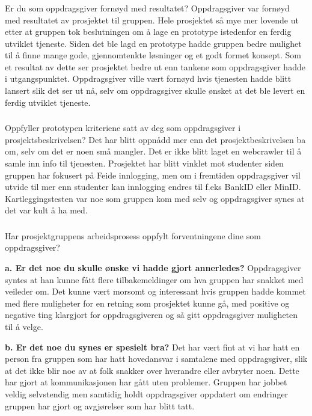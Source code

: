 \subsubsection{}{Er du som oppdragsgiver fornøyd med resultatet?}
Oppdragsgiver var fornøyd med resultatet av prosjektet til gruppen. Hele prosjektet så mye mer lovende ut etter at gruppen tok beslutningen om å lage en prototype istedenfor en ferdig utviklet tjeneste. Siden det ble lagd en prototype hadde gruppen bedre mulighet til å finne mange gode, gjennomtenkte løsninger og et godt formet konsept. Som et resultat av dette ser prosjektet bedre ut enn tankene som oppdragsgiver hadde i utgangspunktet. Oppdragsgiver ville vært fornøyd hvis tjenesten hadde blitt lansert slik det ser ut nå, selv om oppdragsgiver skulle ønsket at det ble levert en ferdig utviklet tjeneste.

\subsubsection{}{Oppfyller prototypen kriteriene satt av deg som oppdragsgiver i prosjektsbeskrivelsen?}
Det har blitt oppnådd mer enn det prosjektbeskrivelsen ba om, selv om det er noen små mangler. Det er ikke blitt laget en webcrawler til å samle inn info til tjenesten. Prosjektet har blitt vinklet mot studenter siden gruppen har fokusert på Feide innlogging, men om i fremtiden oppdragsgiver vil utvide til mer enn studenter kan innlogging endres til f.eks BankID eller MinID. Kartleggingstesten var noe som gruppen kom med selv og oppdragsgiver synes at det var kult å ha med. 

\subsubsection{}{Har prosjektgruppens arbeidsprosess oppfylt forventningene dine som oppdragsgiver?}

{\bf a. Er det noe du skulle ønske vi hadde gjort annerledes?}
Oppdragsgiver syntes at han kunne fått flere tilbakemeldinger om hva gruppen har snakket med veileder om. Det kunne vært morsomt og interessant hvis gruppen hadde kommet med flere muligheter for en retning som prosjektet kunne gå, med positive og negative ting klargjort for oppdragsgiveren og så gitt oppdragsgiver muligheten til å velge.

{\bf b. Er det noe du synes er spesielt bra?}
Det har vært fint at vi har hatt en person fra gruppen som har hatt hovedansvar i samtalene med oppdragsgiver, slik at det ikke blir noe av at folk snakker over hverandre eller avbryter noen. Dette har gjort at kommunikasjonen  har gått uten problemer. Gruppen har jobbet veldig selvstendig men samtidig holdt oppdragsgiver oppdatert om endringer gruppen har gjort og avgjørelser som har blitt tatt.

